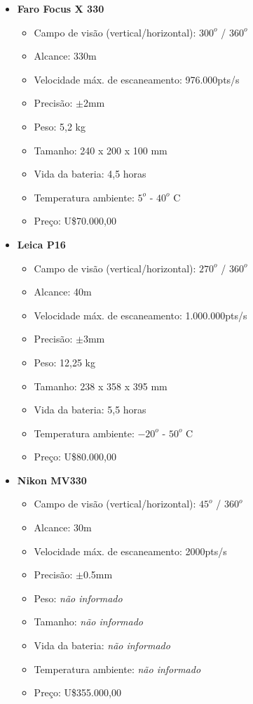 \begin{itemize}
  \item \textbf{Faro Focus X 330}
  	\begin{itemize}
  		\item Campo de visão (vertical/horizontal): $300^o$ / $360^o$
  		\item Alcance: 330m
  		\item Velocidade máx. de escaneamento: 976.000pts/s
  		\item Precisão: $\pm$2mm
  		\item Peso: 5,2 kg
  		\item Tamanho: 240 x 200 x 100 mm
  		\item Vida da bateria: 4,5 horas
  		\item Temperatura ambiente: $5^o$ - $40^o$ C
  		\item Preço: U\$70.000,00
	\end{itemize}
  \item \textbf{Leica P16}
  	\begin{itemize}
  		\item Campo de visão (vertical/horizontal): $270^o$ / $360^o$
  		\item Alcance: 40m
  		\item Velocidade máx. de escaneamento: 1.000.000pts/s
  		\item Precisão: $\pm$3mm
  		\item Peso: 12,25 kg
  		\item Tamanho: 238 x 358 x 395 mm
  		\item Vida da bateria: 5,5 horas
  		\item Temperatura ambiente: $-20^o$ - $50^o$ C
  		\item Preço: U\$80.000,00
	\end{itemize}
   \item \textbf{Nikon MV330}
  	\begin{itemize}
  		\item Campo de visão (vertical/horizontal): $45^o$ / $360^o$
  		\item Alcance: 30m
  		\item Velocidade máx. de escaneamento: 2000pts/s
  		\item Precisão: $\pm$0.5mm
  		\item Peso: \textit{não informado}
  		\item Tamanho: \textit{não informado}
  		\item Vida da bateria: \textit{não informado}
  		\item Temperatura ambiente: \textit{não informado}
  		\item Preço: U\$355.000,00
	\end{itemize}


\end{itemize}


